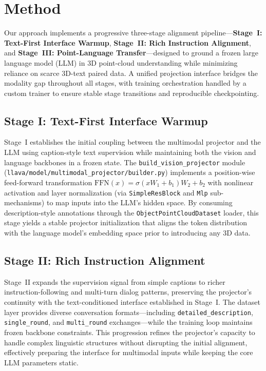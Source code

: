 \section{Method}\label{sec:method}

Our approach implements a progressive three-stage alignment pipeline---\textbf{Stage~I: Text-First Interface Warmup}, \textbf{Stage~II: Rich Instruction Alignment}, and \textbf{Stage~III: Point-Language Transfer}---designed to ground a frozen large language model (LLM) in 3D point-cloud understanding while minimizing reliance on scarce 3D-text paired data. A unified projection interface bridges the modality gap throughout all stages, with training orchestration handled by a custom trainer to ensure stable stage transitions and reproducible checkpointing.

\subsection{Stage I: Text-First Interface Warmup}\label{subsec:stage1}

Stage~I establishes the initial coupling between the multimodal projector and the LLM using caption-style text supervision while maintaining both the vision and language backbones in a frozen state. The \texttt{build\_vision\_projector} module (\texttt{llava/model/multimodal\_projector/builder.py}) implements a position-wise feed-forward transformation $\mathrm{FFN}(x)=\sigma(xW_1+b_1)W_2+b_2$ with nonlinear activation and layer normalization (via \texttt{SimpleResBlock} and \texttt{Mlp} sub-mechanisms) to map inputs into the LLM's hidden space. By consuming description-style annotations through the \texttt{ObjectPointCloudDataset} loader, this stage yields a stable projector initialization that aligns the token distribution with the language model's embedding space prior to introducing any 3D data.

\subsection{Stage II: Rich Instruction Alignment}\label{subsec:stage2}

Stage~II expands the supervision signal from simple captions to richer instruction-following and multi-turn dialog patterns, preserving the projector's continuity with the text-conditioned interface established in Stage~I. The dataset layer provides diverse conversation formats---including \texttt{detailed\_description}, \texttt{single\_round}, and \texttt{multi\_round} exchanges---while the training loop maintains frozen backbone constraints. This progression refines the projector's capacity to handle complex linguistic structures without disrupting the initial alignment, effectively preparing the interface for multimodal inputs while keeping the core LLM parameters static.

